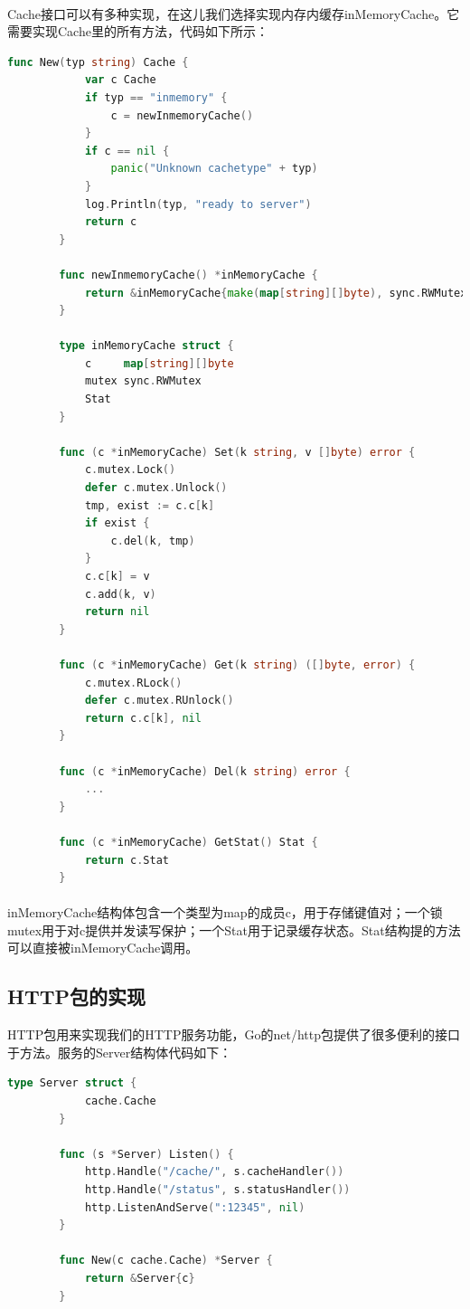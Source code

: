 \documentclass{article}
\begin{document}
	\paragraph{}
	Cache接口可以有多种实现，在这儿我们选择实现内存内缓存inMemoryCache。它需要实现Cache里的所有方法，代码如下所示：
	\begin{lstlisting}[language=Go]
		func New(typ string) Cache {
			var c Cache
			if typ == "inmemory" {
				c = newInmemoryCache()
			}
			if c == nil {
				panic("Unknown cachetype" + typ)
			}
			log.Println(typ, "ready to server")
			return c
		}
	
		func newInmemoryCache() *inMemoryCache {
			return &inMemoryCache{make(map[string][]byte), sync.RWMutex{}, Stat{}}
		}
		
		type inMemoryCache struct {
			c     map[string][]byte
			mutex sync.RWMutex
			Stat
		}
		
		func (c *inMemoryCache) Set(k string, v []byte) error {
			c.mutex.Lock()
			defer c.mutex.Unlock()
			tmp, exist := c.c[k]
			if exist {
				c.del(k, tmp)
			}
			c.c[k] = v
			c.add(k, v)
			return nil
		}
		
		func (c *inMemoryCache) Get(k string) ([]byte, error) {
			c.mutex.RLock()
			defer c.mutex.RUnlock()
			return c.c[k], nil
		}
		
		func (c *inMemoryCache) Del(k string) error {
			...
		}
		
		func (c *inMemoryCache) GetStat() Stat {
			return c.Stat
		}
	\end{lstlisting}
	\paragraph{}
	inMemoryCache结构体包含一个类型为map的成员c，用于存储键值对；一个锁mutex用于对c提供并发读写保护；一个Stat用于记录缓存状态。Stat结构提的方法可以直接被inMemoryCache调用。
	\subsection{HTTP包的实现}
	HTTP包用来实现我们的HTTP服务功能，Go的net/http包提供了很多便利的接口于方法。服务的Server结构体代码如下：
	\begin{lstlisting}[language=Go]
		type Server struct {
			cache.Cache
		}
		
		func (s *Server) Listen() {
			http.Handle("/cache/", s.cacheHandler())
			http.Handle("/status", s.statusHandler())
			http.ListenAndServe(":12345", nil)
		}
		
		func New(c cache.Cache) *Server {
			return &Server{c}
		}
	\end{lstlisting}
\end{document}
